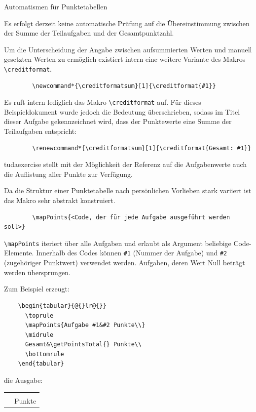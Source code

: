 \documentclass[
	ngerman,
	points=true,%
	]{tudaexercise}
\let\code\texttt
\let\cls\textsf
\let\tbs\textbackslash
\renewcommand*{\creditformatsum}[1]{\creditformat{Gesamt: #1}}
\begin{document}
\begin{task}[points=auto]{Automatismen für Punktetabellen}
\begin{subtask}[points=2,title=Punkte aus Teilaufgaben aufsummieren]
	Es erfolgt derzeit keine automatische Prüfung auf die Übereinstimmung zwischen der Summe der Teilaufgaben und der Gesamtpunktzahl.
	
	Um die Unterscheidung der Angabe zwischen aufsummierten Werten und manuell gesetzten Werten zu ermöglich existiert intern eine weitere Variante des Makros \code{\tbs{}creditformat}.
	
	\begin{verbatim}
		\newcommand*{\creditformatsum}[1]{\creditformat{#1}}
	\end{verbatim}

	Es ruft intern lediglich das Makro \code{\tbs{}creditformat} auf. Für dieses Beispieldokument wurde jedoch die Bedeutung überschrieben, sodass im Titel dieser Aufgabe gekennzeichnet wird, dass der Punktewerte eine Summe der Teilaufgaben entspricht:
	
	\begin{verbatim}
		\renewcommand*{\creditformatsum}[1]{\creditformat{Gesamt: #1}}
	\end{verbatim}
\end{subtask}

\begin{subtask}[points=3,title=Automatische Punktetabellen]
	\cls{tudaexercise} stellt mit der Möglichkeit der Referenz auf die Aufgabenwerte auch die Auflistung aller Punkte zur Verfügung.
	
	Da die Struktur einer Punktetabelle nach persönlichen Vorlieben stark variiert ist das Makro sehr abstrakt konstruiert.

	\begin{verbatim}
		\mapPoints{<Code, der für jede Aufgabe ausgeführt werden soll>}
	\end{verbatim}

	\code{\tbs{}mapPoints} iteriert über alle Aufgaben und erlaubt als Argument beliebige Code-Elemente. Innerhalb des Codes können \code{\#1} (Nummer der Aufgabe) und \code{\#2} (zugehöriger Punktwert) verwendet werden. 
	Aufgaben, deren Wert Null beträgt werden übersprungen. 
	
	Zum Beispiel erzeugt:
	\begin{verbatim}
	\begin{tabular}{@{}lr@{}}
	  \toprule
	  \mapPoints{Aufgabe #1&#2 Punkte\\}
	  \midrule
	  Gesamt&\getPointsTotal{} Punkte\\
	  \bottomrule
	\end{tabular}
	\end{verbatim}
	die Ausgabe:\\
	\begin{tabular}{@{}lr@{}}
		\toprule
		\mapPoints{Aufgabe #1&#2 Punkte\\}
		\midrule
		Gesamt&\getPointsTotal{} Punkte\\
		\bottomrule
	\end{tabular}


\end{subtask}
\end{task}
\end{document}

